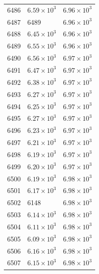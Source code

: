 \begin{table}[H]
\begin{tabular}{lll}
6486 & $\displaystyle 6.59 \times 10^{3}$ & $\displaystyle 6.96 \times 10^{3}$ \\
6487 & 6489 & $\displaystyle 6.96 \times 10^{3}$ \\
6488 & $\displaystyle 6.45 \times 10^{3}$ & $\displaystyle 6.96 \times 10^{3}$ \\
6489 & $\displaystyle 6.55 \times 10^{3}$ & $\displaystyle 6.96 \times 10^{3}$ \\
6490 & $\displaystyle 6.56 \times 10^{3}$ & $\displaystyle 6.97 \times 10^{3}$ \\
6491 & $\displaystyle 6.47 \times 10^{3}$ & $\displaystyle 6.97 \times 10^{3}$ \\
6492 & $\displaystyle 6.38 \times 10^{3}$ & $\displaystyle 6.97 \times 10^{3}$ \\
6493 & $\displaystyle 6.27 \times 10^{3}$ & $\displaystyle 6.97 \times 10^{3}$ \\
6494 & $\displaystyle 6.25 \times 10^{3}$ & $\displaystyle 6.97 \times 10^{3}$ \\
6495 & $\displaystyle 6.27 \times 10^{3}$ & $\displaystyle 6.97 \times 10^{3}$ \\
6496 & $\displaystyle 6.23 \times 10^{3}$ & $\displaystyle 6.97 \times 10^{3}$ \\
6497 & $\displaystyle 6.21 \times 10^{3}$ & $\displaystyle 6.97 \times 10^{3}$ \\
6498 & $\displaystyle 6.19 \times 10^{3}$ & $\displaystyle 6.97 \times 10^{3}$ \\
6499 & $\displaystyle 6.20 \times 10^{3}$ & $\displaystyle 6.97 \times 10^{3}$ \\
6500 & $\displaystyle 6.19 \times 10^{3}$ & $\displaystyle 6.98 \times 10^{3}$ \\
6501 & $\displaystyle 6.17 \times 10^{3}$ & $\displaystyle 6.98 \times 10^{3}$ \\
6502 & 6148 & $\displaystyle 6.98 \times 10^{3}$ \\
6503 & $\displaystyle 6.14 \times 10^{3}$ & $\displaystyle 6.98 \times 10^{3}$ \\
6504 & $\displaystyle 6.11 \times 10^{3}$ & $\displaystyle 6.98 \times 10^{3}$ \\
6505 & $\displaystyle 6.09 \times 10^{3}$ & $\displaystyle 6.98 \times 10^{3}$ \\
6506 & $\displaystyle 6.16 \times 10^{3}$ & $\displaystyle 6.98 \times 10^{3}$ \\
6507 & $\displaystyle 6.15 \times 10^{3}$ & $\displaystyle 6.98 \times 10^{3}$ \\

\end{tabular}
\end{table}
